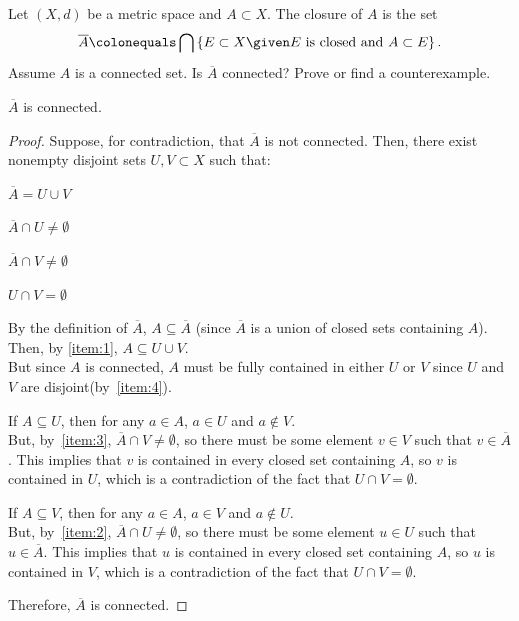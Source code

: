 \begin{problem}
  Let $(X, d)$ be a metric space and $A \subset X$.
  The closure of $A$ is the set
  \[
    \overline{A} \colonequals \bigcap \set{
      E \subset X \given \text{$E$ is closed and $A \subset E$}
    }.
  \]
  Assume $A$ is a connected set.
  Is $\overline{A}$ connected?
  Prove or find a counterexample.
\end{problem}

\begin{answer}
  $\overline{A}$ is connected.
  \begin{proof}
    Suppose, for contradiction, that $\overline{A}$ is not connected.
    Then, there exist nonempty disjoint sets $U, V \subset X$ such that:
    \begin{enumarabic}
      \item $\overline{A} = U \cup V$~\label{item:1}
      \item $\overline{A} \cap U \neq \emptyset$~\label{item:2}
      \item $\overline{A} \cap V \neq \emptyset$~\label{item:3}
      \item $U \cap V = \emptyset$~\label{item:4}
    \end{enumarabic}
    By the definition of $\overline{A}$, $A \subseteq \overline{A}$
    (since $\overline{A}$ is a union of closed sets containing $A$).
    Then, by \ref{item:1}, $A \subseteq U \cup V$. \\
    But since $A$ is connected, $A$ must be fully contained in either $U$ or $V$
    since $U$ and $V$ are disjoint(by~\ref{item:4}).
    \begin{enumarabic}
      \item If $A \subseteq U$, then for any $a \in A$, $a \in U$
        and $a \not \in V$. \\
        But, by~\ref{item:3}, $\overline{A} \cap V \neq \emptyset$,
        so there must be some element $v \in V$ such that $v \in \overline{A}$.
        This implies that $v$ is contained in every closed set containing $A$,
        so $v$ is contained in $U$, which is a contradiction of the fact that $U \cap V = \emptyset$.

      \item If $A \subseteq V$, then for any $a \in A$, $a \in V$
        and $a \not \in U$. \\
        But, by~\ref{item:2}, $\overline{A} \cap U \neq \emptyset$,
        so there must be some element $u \in U$ such that $u \in \overline{A}$.
        This implies that $u$ is contained in every closed set containing $A$,
        so $u$ is contained in $V$, which is a contradiction of the fact that $U \cap V = \emptyset$.

    \end{enumarabic}
    Therefore, $\overline{A}$ is connected.
    
  \end{proof}
\end{answer}
